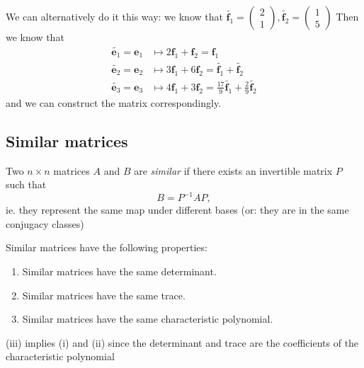 \documentclass[a4paper]{article}
\begin{document}
\begin{eg}
        We can alternatively do it this way: we know that $\tilde{\mathbf{f}_1} = 
        \begin{pmatrix}
          2\\1
        \end{pmatrix}, \tilde{\mathbf{f}_2} = 
        \begin{pmatrix}
          1\\5
        \end{pmatrix}$
        Then we know that 
        \begin{align*}
          \tilde{\mathbf{e}_1} = \mathbf{e}_1 &\mapsto 2\mathbf{f}_1 + \mathbf{f}_2 = \mathbf{f}_1\\
          \tilde{\mathbf{e}_2} = \mathbf{e}_2 &\mapsto 3\mathbf{f}_1 + 6\mathbf{f}_2 = \tilde{\mathbf{f}_1} + \tilde{\mathbf{f}_2}\\
          \tilde{\mathbf{e}_3} = \mathbf{e}_3 &\mapsto 4\mathbf{f}_1 + 3\mathbf{f}_2 = \frac{17}{9} \tilde{\mathbf{f}_1} + \frac{2}{9}\tilde{\mathbf{f}_2}
        \end{align*}
        and we can construct the matrix correspondingly.
      \end{eg}
      \subsection{Similar matrices}
      \begin{defi}
        Two $n\times n$ matrices $A$ and $B$ are \emph{similar} if there exists an invertible matrix $P$ such that
        \[
          B = P^{-1}AP,
        \]
        ie. they represent the same map under different bases (or: they are in the same conjugacy classes)
      \end{defi}

      \begin{prop}
        Similar matrices have the following properties:
        \begin{enumerate}
          \item Similar matrices have the same determinant.
          \item Similar matrices have the same trace.
          \item Similar matrices have the same characteristic polynomial.
        \end{enumerate}
      \end{prop}
      \note (iii) implies (i) and (ii) since the determinant and trace are the coefficients of the characteristic polynomial
\end{document}
